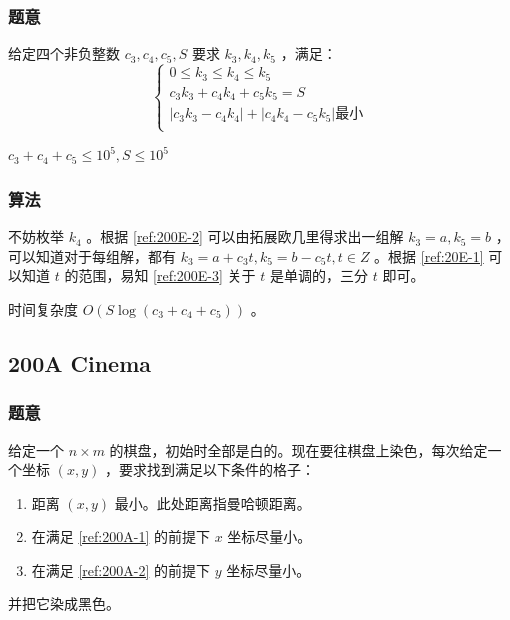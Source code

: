\documentclass[11pt]{article}
\begin{document}
\subsubsection{题意}
\label{sec-11-4-1}

    给定四个非负整数 $c_3, c_4, c_5, S$ 要求 $k_3, k_4, k_5$ ，满足：
    \begin{displaymath}
    \begin{cases}
    \label{ref:200E-1} 0 \leq k_3 \leq k_4 \leq k_5 \\
    \label{ref:200E-2} c_3 k_3 + c_4 k_4 + c_5 k_5 = S \\
    \label{ref:200E-3} |c_3 k_3 - c_4 k_4| +|c_4 k_4 - c_5 k_5| \text{最小} \\
    \end{cases}
    \end{displaymath}

    $c_3 + c_4 + c_5 \leq 10^5, S \leq 10^5$
\subsubsection{算法}
\label{sec-11-4-2}

    不妨枚举 $k_4$ 。根据 \ref{ref:200E-2} 可以由拓展欧几里得求出一组解 $k_3 = a, k_5 = b$ ，可以知道对于每组解，都有 $k_3 = a + c_3 t, k_5 = b - c_5 t, t \in Z$ 。根据 \ref{ref:20E-1} 可以知道 $t$ 的范围，易知 \ref{ref:200E-3} 关于 $t$ 是单调的，三分 $t$ 即可。

    时间复杂度 $O(S \log (c_3 + c_4 +c_5))$ 。
 
\subsection{200A  Cinema}
\label{sec-11-5}
\subsubsection{题意}
\label{sec-11-5-1}

    给定一个 $n \times m$ 的棋盘，初始时全部是白的。现在要往棋盘上染色，每次给定一个坐标 $(x, y)$ ，要求找到满足以下条件的格子：
\begin{enumerate}
\item \label{ref:200A-1} 距离 $(x, y)$ 最小。此处距离指曼哈顿距离。
\item \label{ref:200A-2} 在满足 \ref{ref:200A-1} 的前提下 $x$ 坐标尽量小。
\item 在满足 \ref{ref:200A-2} 的前提下 $y$ 坐标尽量小。
\end{enumerate}
    并把它染成黑色。
\end{document}

